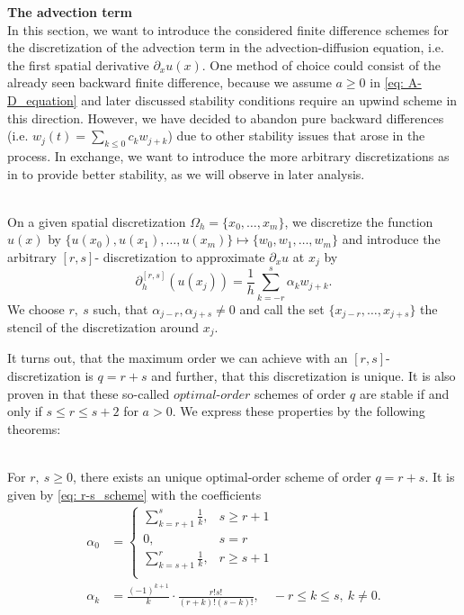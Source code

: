 \textbf{The advection term}
\vspace{2mm}
\\
In this section, we want to introduce the considered finite difference schemes for the discretization of the advection term in the advection-diffusion equation, i.e. the first spatial derivative $\partial_xu(x)$. One method of choice could consist of the already seen backward finite difference, because we assume $a\ge0$ in \eqref{eq: A-D_equation} and later discussed stability conditions require an upwind scheme in this direction. However, we have decided to abandon pure backward differences (i.e. $w_j(t)=\sum\limits_{k\le 0} c_kw_{j+k}$) due to other stability issues that arose in the process. In exchange, we want to introduce the more arbitrary discretizations as in \cite{Iserles1982} to provide better stability, as we will observe in later analysis.
\begin{definition}\mbox{}\\
	On a given spatial discretization $\Omega_h=\{x_0,\hdots, x_m\}$, we discretize the function $u(x)$ by $\{u(x_0), u(x_1), \hdots, u(x_m)\}\mapsto\{w_0, w_1, \hdots, w_m\}$ and introduce the arbitrary $[r,s]$- discretization to approximate $\partial_xu$ at $x_j$ by
	\begin{equation}\label{eq: r-s_scheme}
	\partial^{[r,s]}_h(u(x_j)) = \frac{1}{h} \sum\limits_{k=-r}^s \alpha_k w_{j+k}.
	\end{equation}
	We choose $r,\ s$ such, that $\alpha_{j-r}, \alpha_{j+s} \neq 0$ and call the set $\{x_{j-r}, \hdots, x_{j+s}\}$ the stencil of the discretization around $x_j$.
\end{definition}
It turns out, that the maximum order we can achieve with an $[r,s]$- discretization is $q=r+s$ and further, that this discretization is unique. It is also proven in \cite{Iserles1982} that these so-called $\textit{optimal-order}$ schemes of order $q$ are stable if and only if $s\le r \le s+2$ for $a>0$. We express these properties by the following theorems:
\begin{prop}\mbox{}\\
	For $r, \ s \ge0$, there exists an unique optimal-order scheme of order $q=r+s$. It is given by \eqref{eq: r-s_scheme} with the coefficients
	\begin{align*}
	\alpha_0&=\left\{ \begin{array}{cc}
	\sum\limits_{k=r+1}^s\frac{1}{k}, & s\ge r+1 \\
	0, & s=r \\
	\sum\limits_{k=s+1}^r\frac{1}{k}, & r\ge s+1 \\
	\end{array}
	\right. \\
	\alpha_k &= \frac{(-1)^{k+1}}{k}\cdot \frac{r!s!}{(r+k)!(s-k)!}, \quad -r\le k \le s, \ k\neq0.
	\end{align*}
\end{prop}

